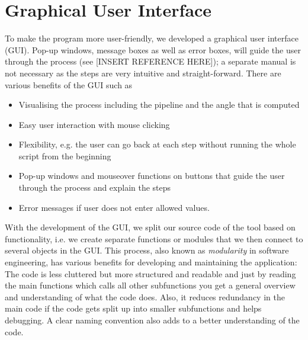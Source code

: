 
\section{Graphical User Interface}
To make the program more user-friendly, we developed a graphical user interface (GUI). Pop-up windows, message boxes as well as error boxes, will guide the user through the process (see [INSERT REFERENCE HERE]); a separate manual is not necessary as the steps are very intuitive and straight-forward.
There are various benefits of the GUI such as
\begin{itemize}
	\item Visualising the process including the pipeline and the angle that is computed
	\item Easy user interaction with mouse clicking
	\item Flexibility, e.g. the user can go back at each step without running the whole script from the beginning
	\item Pop-up windows and mouseover functions on buttons that guide the user through the process and explain the steps
	\item Error messages if user does not enter allowed values.
\end{itemize}


With the development of the GUI, we split our source code of the tool based on functionality, i.e. we create separate functions or modules that we then connect to several objects in the GUI. This process, also known as \textit{modularity} in software engineering, has various benefits for developing and maintaining the application: The code is less cluttered but more structured and readable and just by reading the main functions which calls all other subfunctions you get a general overview and understanding of what the code does. Also, it reduces redundancy in the main code if the code gets split up into smaller subfunctions and helps debugging. A clear naming convention also adds to a better understanding of the code.



